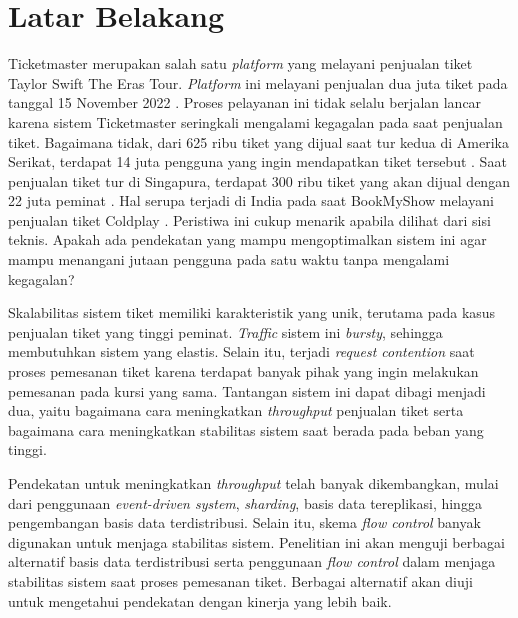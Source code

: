 \section{Latar Belakang}
\label{sec:latar-belakang}

Ticketmaster merupakan salah satu \textit{platform} yang melayani penjualan tiket Taylor Swift The Eras Tour. \textit{Platform} ini melayani penjualan dua juta tiket pada tanggal 15 November 2022 \parencite{swiftTicketmaster}. Proses pelayanan ini tidak selalu berjalan lancar karena sistem Ticketmaster seringkali mengalami kegagalan pada saat penjualan tiket. Bagaimana tidak, dari 625 ribu tiket yang dijual saat tur kedua di Amerika Serikat, terdapat 14 juta pengguna yang ingin mendapatkan tiket tersebut \parencite{USTaylorSwift}. Saat penjualan tiket tur di Singapura, terdapat 300 ribu tiket yang akan dijual dengan 22 juta peminat \parencite{asiaTaylorSwift}. Hal serupa terjadi di India pada saat BookMyShow melayani penjualan tiket Coldplay \parencite{coldplayBookMyShow}. Peristiwa ini cukup menarik apabila dilihat dari sisi teknis. Apakah ada pendekatan yang mampu mengoptimalkan sistem ini agar mampu menangani jutaan pengguna pada satu waktu tanpa mengalami kegagalan?

Skalabilitas sistem tiket memiliki karakteristik yang unik, terutama pada kasus penjualan tiket yang tinggi peminat. \textit{Traffic} sistem ini \textit{bursty}, sehingga membutuhkan sistem yang elastis. Selain itu, terjadi \textit{request contention} saat proses pemesanan tiket karena terdapat banyak pihak yang ingin melakukan pemesanan pada kursi yang sama. Tantangan sistem ini dapat dibagi menjadi dua, yaitu bagaimana cara meningkatkan \textit{throughput} penjualan tiket serta bagaimana cara meningkatkan stabilitas sistem saat berada pada beban yang tinggi.

Pendekatan untuk meningkatkan \textit{throughput} telah banyak dikembangkan, mulai dari penggunaan \textit{event-driven system}, \textit{sharding}, basis data tereplikasi, hingga pengembangan basis data terdistribusi. Selain itu, skema \textit{flow control} banyak digunakan untuk menjaga stabilitas sistem. Penelitian ini akan menguji berbagai alternatif basis data terdistribusi serta penggunaan \textit{flow control} dalam menjaga stabilitas sistem saat proses pemesanan tiket. Berbagai alternatif akan diuji untuk mengetahui pendekatan dengan kinerja yang lebih baik.
